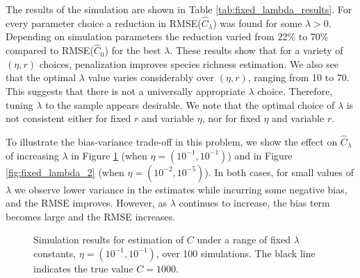 \documentclass[12pt]{article}
\theoremstyle{break}
\theoremstyle{break}
\begin{document}
The results of the simulation are shown in Table \ref{tab:fixed_lambda_results}.  For every parameter choice a reduction in RMSE($\widehat{C}_{\lambda}$) was found for some $\lambda > 0$.  Depending on simulation parameters the reduction varied from 22\% to 70\% compared to RMSE($\widehat{C}_{0}$) for the best $\lambda$.  These results show that for a variety of $(\eta, r)$ choices, penalization improves species richness estimation.
We also see that the optimal $\lambda$ value varies considerably over $(\eta, r)$, ranging from 10 to 70.  This suggests that there is not a universally appropriate $\lambda$ choice. Therefore, tuning $\lambda$ to the sample appears desirable. We note that the optimal choice of $\lambda$ is not consistent either for fixed $r$ and variable $\eta$, nor for fixed $\eta$ and variable $r$.

To illustrate the bias-variance trade-off in this problem, we show the  effect on $\widehat{C}_{\lambda}$ of increasing $\lambda$ in Figure \ref{fig:fixed_lambda} (when $\eta = (10^{-1}, 10^{-1})$) and in Figure \ref{fig:fixed_lambda_2} (when $\eta = (10^{-2}, 10^{-5})$).
In both cases, for small values of $\lambda$ we observe lower variance in the estimates while incurring some negative bias, and the RMSE improves. However, as $\lambda$ continues to increase, the bias term becomes large and the RMSE increases.

\begin{figure}[p]
\caption{Simulation results for estimation of $C$ under a range of fixed $\lambda$ constants, $\eta = (10^{-1}, 10^{-1})$, over 100 simulations. The black line indicates the true value $C = 1000$.
\label{fig:fixed_lambda}}
\centering{}
\end{figure}
\end{document}
